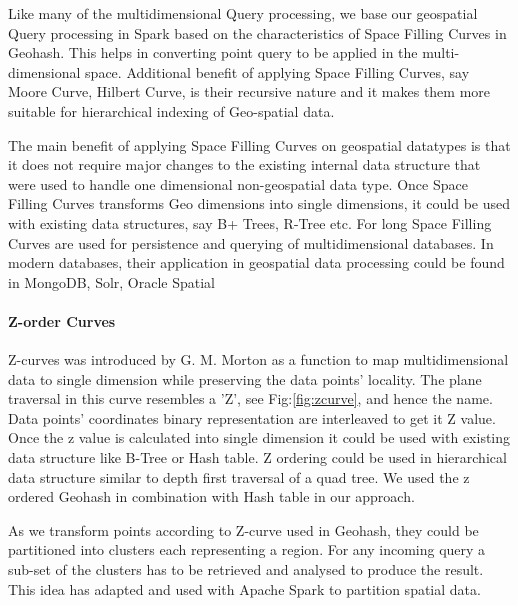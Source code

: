 \documentclass[article,type=msc,colorback,12pt,accentcolor=tud1d]{tudthesis}
\begin{document}
		  
		  Like many of the multidimensional Query processing\cite{DBLP:conf/pods/XuT12}, we base our geospatial Query processing in Spark based on the characteristics of Space Filling Curves in Geohash. This helps in converting point query to be applied in the multi-dimensional space\cite{DBLP:conf/pods/XuT12}. Additional benefit of applying Space Filling Curves, say Moore Curve\cite{wiki:Moorecurve_1, wiki:Moorecurve}, Hilbert Curve\cite{wiki:hilbertcurve_1, wiki:hilbertcurve}, is their recursive nature and it makes them more suitable for hierarchical indexing of Geo-spatial data\cite{kevinSFCthesis}. 
		  
		  The main benefit of applying Space Filling Curves on geospatial datatypes is that it does not require major changes to the existing internal data structure that were used to handle one dimensional non-geospatial data type. Once Space Filling Curves transforms Geo dimensions into single dimensions, it could be used with existing data structures, say B+ Trees, R-Tree etc\cite{Asano1995}. For long Space Filling Curves are used for persistence and querying of multidimensional databases\cite{Lawder:2000:USC:646102.681186}. In modern databases, their application in geospatial data processing could be found in MongoDB\cite{MongoDB}, Solr\cite{apachesolr}, Oracle Spatial\cite{oraclespatial} 
		  
		  \clearpage
		  \paragraph{Z-order Curves}
		  Z-curves was introduced by G. M. Morton as a function to map multidimensional data to single dimension while preserving the data points' locality. The plane traversal in this curve resembles a 'Z', see Fig:\ref{fig:zcurve},  and hence the name. Data points' coordinates binary representation are interleaved to get it Z value. Once the z value is calculated into single dimension it could be used with existing data structure like B-Tree or Hash table. Z ordering could be used in hierarchical data structure similar to depth first traversal of a quad tree\cite{wiki:Zcurves_1, wiki:Zcurves}. We used the z ordered Geohash in combination with Hash table in our approach. 
		  
		  As we transform points according to Z-curve used in Geohash, they could be partitioned into clusters each representing a region. For any incoming query a sub-set of the clusters has to be retrieved and analysed to produce the result. This idea has adapted and used with Apache Spark to partition spatial data.
		  
\end{document}

